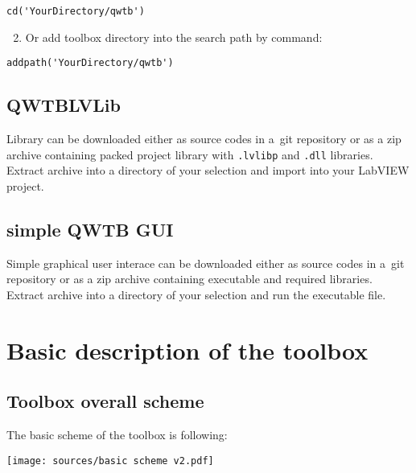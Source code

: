 \documentclass[12pt,a4paper,oneside]{report} %
\def\labview{{\sc LabVIEW}\xspace}
\begin{document}
\begin{lstlisting}
cd('YourDirectory/qwtb')
\end{lstlisting}

\begin{enumerate}
        \setcounter{enumi}{1}
        \item Or add toolbox directory into the search path by command:
\end{enumerate}
\begin{lstlisting}
addpath('YourDirectory/qwtb')
\end{lstlisting}

\section{QWTBLVLib} %
Library can be downloaded either as source codes in a~{\sc git} repository or as a zip archive
containing packed project library with {\tt .lvlibp} and {\tt .dll} libraries. Extract archive into
a directory of your selection and import into your \labview project. 

\section{simple QWTB GUI} %
Simple graphical user interace can be downloaded either as source codes in a~{\sc git} repository or
as a zip archive containing executable and required libraries. Extract archive into a directory of
your selection and run the executable file.

\chapter{Basic description of the toolbox} %
\section{Toolbox overall scheme} %
The basic scheme of the toolbox is following:
\begin{center}
        \texttt{[image: sources/basic scheme v2.pdf]}
\end{center}
\end{document}
